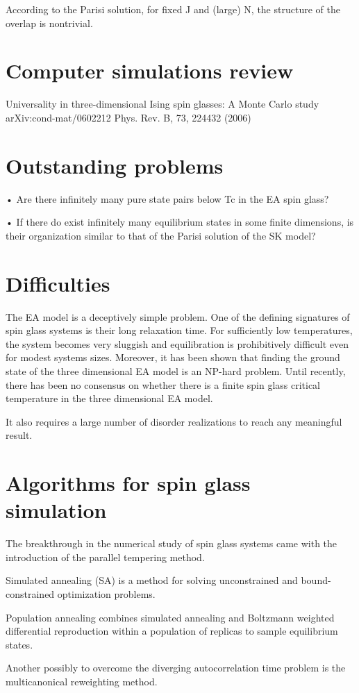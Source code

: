 According to the Parisi solution, for fixed J and (large) N, the structure of 
the overlap is nontrivial.

\section{Computer simulations review}

Universality in three-dimensional Ising spin glasses: A Monte Carlo study
arXiv:cond-mat/0602212 Phys. Rev. B, 73, 224432 (2006)



\section{Outstanding problems}

• Are there infinitely many pure state pairs below Tc in the EA spin glass?

• If there do exist infinitely many equilibrium states in some finite 
dimensions, is their organization similar to that of the Parisi solution of the 
SK model?


\section{Difficulties}
The EA model is a deceptively simple problem. %
One of the defining signatures of spin glass systems is their long relaxation 
time. 
For sufficiently low temperatures, the system becomes very sluggish and 
equilibration is prohibitively difficult even for modest systems sizes. 
Moreover, it has been shown that finding the ground state of the three 
dimensional EA model is an NP-hard problem. \cite{Barahona-1982} 
Until recently, there has been no consensus on whether there is a finite spin 
glass critical temperature in the three dimensional EA model.

It also requires a large number of disorder realizations to reach any 
meaningful result.


\section{Algorithms for spin glass simulation}
The breakthrough in the numerical study of spin glass systems came with the 
introduction of the parallel tempering method.

Simulated annealing (SA) is a method for solving unconstrained and 
bound-constrained optimization problems.

Population annealing combines simulated annealing and Boltzmann weighted 
differential reproduction within a population of replicas to sample equilibrium 
states.

Another possibly to overcome the diverging autocorrelation time problem is the 
multicanonical reweighting method.

